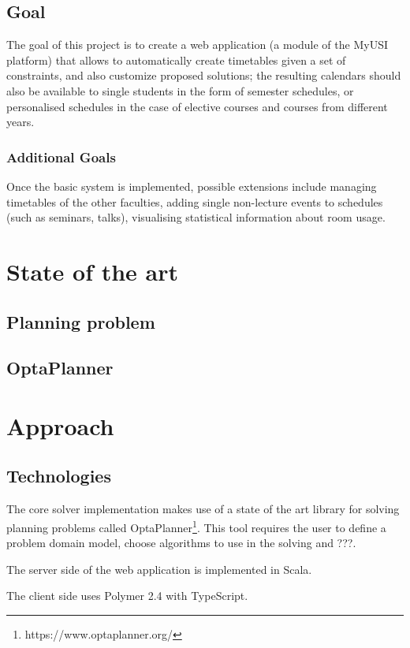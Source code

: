 \documentclass[12pt, a4paper, english]{report}
\begin{document}
\subsection{Goal}
The goal of this project is to create a web application (a module of the MyUSI platform) that allows to automatically create timetables given a set of constraints, and also customize proposed solutions; the resulting calendars should also be available to single students in the form of semester schedules, or personalised schedules in the case of elective courses and courses from different years.

\subsubsection{Additional Goals}
Once the basic system is implemented, possible extensions include managing timetables of the other faculties, adding single non-lecture events to schedules (such as seminars, talks), visualising statistical information about room usage.

\section{State of the art}
\subsection{Planning problem}
\subsection{OptaPlanner}

\section{Approach}
\subsection{Technologies}
The core solver implementation makes use of a state of the art library for solving planning problems called OptaPlanner\footnote{https://www.optaplanner.org/}. This tool requires the user to define a problem domain model, choose algorithms to use in the solving and ???.\par
The server side of the web application is implemented in Scala.\par
The client side uses Polymer 2.4 with TypeScript.
\end{document}
